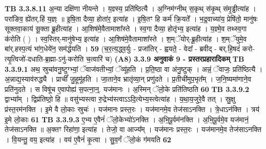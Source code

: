\documentclass[17pt]{extarticle}
\begin{document}
{{{{{{{{{{{{{{{{{{{                  \newline
                                \textbf{ TB 3.3.8.11} \newline
                  अ॒न्या दक्षि॑णा नीयन्ते । य॒ज्ञ्स्य॒ प्रति॑ष्ठित्यै । अ॒ग्निम॑ग्नीथ् स॒कृथ् स॑कृ॒थ् संमृ॒ड्ढीत्या॑ह । परा॑ङिव॒ ह्ये॑तर्.हि॑ य॒ज्ञ्ः ॥ इ॒षि॒ता दैव्या॒ होता॑र॒ इत्या॑ह । इ॒षि॒तꣳ हि कर्म॑ क्रि॒यते᳚ । भ॒द्र॒वाच्या॑य॒ प्रेषि॑तो॒ मानु॑षः सूक्तवा॒काय॑ सू॒क्ता ब्रू॒हीत्या॑ह । आ॒शिष॑मे॒वैतामाशा᳚स्ते । स्व॒गा दैव्या॒ होतृ॑भ्य॒ इत्या॑ह । य॒ज्ञ्मे॒व तथ्स्व॒गा क॑रोति ( ) । स्व॒स्तिर्-मानु॑षेभ्य॒ इत्या॑ह । आ॒शिष॑मे॒वैतामाशा᳚स्ते । श॒म्ॅयोर्-ब्रू॒हीत्या॑ह । श॒म्ॅयुमे॒व बा॑र्.हस्प॒त्यं भा॑ग॒धेये॑न॒ सम॑र्द्धयति । \textbf{ 59} \newline
                  \newline
                                    (च॒र॒त्य॒द्ध्व॒र्युः - प्रजा॑तिर् - ह्वयते॒ - वेदा᳚ - ब्रवीद् - बर्.हि॒षदं॑ करो-त्यृ॒त्विजो॑-दधाति-ब्र॒ह्मा-ऽनु॑-करोति च॒त्वारि॑ च) \textbf{(A8)} \newline \newline
                \textbf{ 3.3.9     अनुवाकं   9 - प्रस्तरप्रहारादिकम्} \newline
                                \textbf{ TB 3.3.9.1} \newline
                  अथ॒ स्रुचा॑वनु॒ष्टुग्भ्यां॒ ॅवाज॑वतीभ्यां॒ ॅव्यू॑हति । प्र॒ति॒ष्ठा वा अ॑नु॒ष्टुक् । अन्नं॒ ॅवाजः॒ प्रति॑ष्ठित्यै । अ॒न्नाद्य॒स्याव॑रुद्ध्यै । प्राचीं᳚ जु॒हूमू॑हति । जा॒ताने॒व भ्रातृ॑व्या॒न् प्रणु॑दते । प्र॒तीची॑मुप॒भृत᳚म् । ज॒नि॒ष्यमा॑णाने॒व प्रति॑नुदते । स विषू॑च ए॒वापोह्य॑ स॒पत्ना॒न्॒. यज॑मानः । अ॒स्मिन् ॅलो॒के प्रति॑तिष्ठति \textbf{ 60} \newline
                  \newline
                                \textbf{ TB 3.3.9.2} \newline
                  द्वाभ्या᳚म् । द्विप्र॑तिष्ठो॒ हि ॥ वसु॑भ्यस्त्वा रु॒द्रेभ्य॑स्त्वाऽऽदि॒त्येभ्य॒स्त्वेत्या॑ह । य॒था॒य॒जुरे॒वै तत् । स्रु॒क्षु प्र॑स्त॒रम॑नक्ति । इ॒मे वै लो॒काः स्रुचः॑ । यज॑मानः प्रस्त॒रः । यज॑मानमे॒व तेज॑साऽनक्ति । त्रे॒धाऽन॑क्ति । त्रय॑ इ॒मे लो॒काः \textbf{ 61} \newline
                  \newline
                                \textbf{ TB 3.3.9.3} \newline
                  ए॒भ्य ए॒वैनं॑ ॅलो॒केभ्यो॑ऽनक्ति । अ॒भि॒पू॒र्वम॑नक्ति । अ॒भि॒पू॒र्वमे॒व यज॑मानं॒ तेज॑साऽनक्ति ॥ अ॒क्तꣳ रिहा॑णा॒ इत्या॑ह । तेजो॒ वा आज्य᳚म् । यज॑मानः प्रस्त॒रः । यज॑मानमे॒व तेज॑साऽनक्ति । वि॒यन्तु॒ वय॒ इत्या॑ह । वय॑ ए॒वैनं॑ कृ॒त्वा । सु॒व॒र्गं ॅलो॒कं ग॑मयति \textbf{ 62} \newline
}}}}}}}}}}}}}}}}}}}
\end{document}
